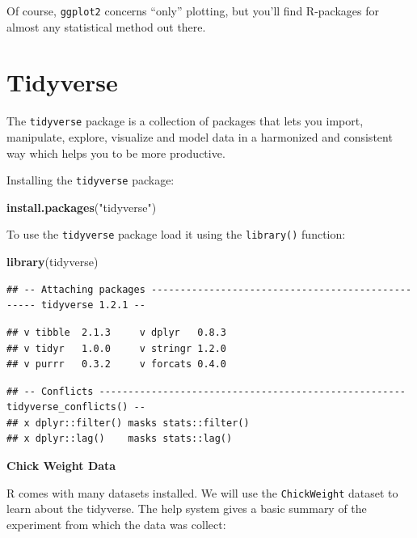 \documentclass[]{book}
\newenvironment{Shaded}{\begin{snugshade}}{\end{snugshade}}
\newcommand{\KeywordTok}[1]{\textcolor[rgb]{0.13,0.29,0.53}{\textbf{#1}}}
\newcommand{\NormalTok}[1]{#1}
\newcommand{\StringTok}[1]{\textcolor[rgb]{0.31,0.60,0.02}{#1}}
\theoremstyle{definition}
\theoremstyle{definition}
\theoremstyle{definition}
\theoremstyle{remark}
\begin{document}
Of course, \texttt{ggplot2} concerns ``only'' plotting, but you'll find R-packages for almost any statistical method out there.

\hypertarget{tidyverse}{%
\section{Tidyverse}\label{tidyverse}}

The \texttt{tidyverse} package is a collection of packages that lets you import,
manipulate, explore, visualize and model data in a harmonized and consistent way which
helps you to be more productive.

Installing the \texttt{tidyverse} package:

\begin{Shaded}
\begin{Highlighting}[]
\KeywordTok{install.packages}\NormalTok{(}\StringTok{"tidyverse"}\NormalTok{)}
\end{Highlighting}
\end{Shaded}

To use the \texttt{tidyverse} package load it using the \texttt{library()} function:

\begin{Shaded}
\begin{Highlighting}[]
\KeywordTok{library}\NormalTok{(tidyverse)}
\end{Highlighting}
\end{Shaded}

\begin{verbatim}
## -- Attaching packages -------------------------------------------------- tidyverse 1.2.1 --
\end{verbatim}

\begin{verbatim}
## v tibble  2.1.3     v dplyr   0.8.3
## v tidyr   1.0.0     v stringr 1.2.0
## v purrr   0.3.2     v forcats 0.4.0
\end{verbatim}

\begin{verbatim}
## -- Conflicts ----------------------------------------------------- tidyverse_conflicts() --
## x dplyr::filter() masks stats::filter()
## x dplyr::lag()    masks stats::lag()
\end{verbatim}

\textbf{Chick Weight Data}

R comes with many datasets installed. We will use the \texttt{ChickWeight} dataset
to learn about the tidyverse. The help system gives a basic summary of the experiment from
which the data was collect:
\end{document}
